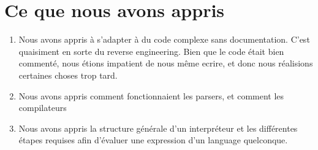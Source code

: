 \documentclass{article}
\begin{document}
\section*{Ce que nous avons appris}
\begin{enumerate}
    \item Nous avons appris à s'adapter à du code complexe sans documentation. C'est quaisiment en sorte du reverse engineering. Bien que le code était bien commenté, nous étions impatient de nous même ecrire, et donc nous réalisions certaines choses trop tard. 

    \item Nous avons appris comment fonctionnaient les parsers, et comment les compilateurs

    \item Nous avons appris la structure générale d'un interpréteur et les différentes étapes requises afin d'évaluer une expression d'un language quelconque.
    
\end{enumerate}
\end{document}
